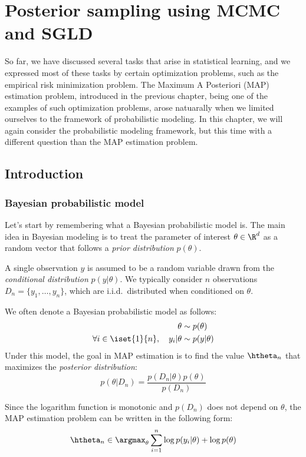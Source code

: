 \documentclass[toc, titlepaged]{../cs-classes/cs-classes}
\begin{document}
\section{Posterior sampling using MCMC and SGLD}
So far, we have discussed several tasks that arise in statistical learning, and we expressed most of these tasks by certain optimization problems, such as the empirical risk minimization problem. The Maximum A Posteriori (MAP) estimation problem, introduced in the previous chapter, being one of the examples of such optimization problems, arose natuarally when we limited ourselves to the framework of probabilistic modeling. In this chapter, we will again consider the probabilistic modeling framework, but this time with a different question than the MAP estimation problem.

\subsection{Introduction}
\subsubsection{Bayesian probabilistic model}
Let's start by remembering what a Bayesian probabilistic model is. The main idea in Bayesian modeling is to treat the parameter of interest $\theta\in\R^d$ as a random vector that follows a \emph{prior distribution} $p(\theta)$. 

A single observation $y$ is assumed to be a random variable drawn from the \emph{conditional distribution} $p(y|\theta)$. We typically consider $n$ observations $D_n=\{y_1, \dots, y_n\}$, which are i.i.d.~distributed when conditioned on $\theta$. 

We often denote a Bayesian probabilistic model as follows:
\begin{equation}
    \begin{aligned}
        \theta&\sim p(\theta)\\
        \forall i\in\iset{1}{n}, \quad y_i|\theta&\sim p(y|\theta)
    \end{aligned}
\end{equation}
Under this model, the goal in MAP estimation is to find the value $\htheta_n$ that maximizes the \emph{posterior distribution}:
\begin{equation}
    p(\theta|D_n) = \frac{p(D_n|\theta)p(\theta)}{p(D_n)}
\end{equation}

Since the logarithm function is monotonic and $p(D_n)$ does not depend on $\theta$, the MAP estimation problem can be written in the following form:
\begin{equation}
    \htheta_n\in\argmax_\theta \sum_{i=1}^n\log p(y_i|\theta)+\log p(\theta)
\end{equation}
\end{document}

